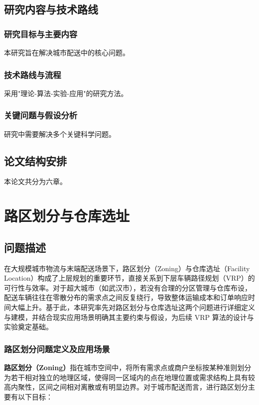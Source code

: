 \documentclass[12pt,a4paper,twoside]{ctexbook}
\begin{document}
\section{研究内容与技术路线}
\subsection{研究目标与主要内容}
本研究旨在解决城市配送中的核心问题。

\subsection{技术路线与流程}
采用"理论-算法-实验-应用"的研究方法。

\subsection{关键问题与假设分析}
研究中需要解决多个关键科学问题。

\section{论文结构安排}
本论文共分为六章。

\chapter{路区划分与仓库选址}
\section{问题描述}

在大规模城市物流与末端配送场景下，路区划分（Zoning）与仓库选址（Facility Location）构成了上层规划的重要环节，直接关系到下层车辆路径规划（VRP）的可行性与效率\cite{1}。对于超大城市（如武汉市），若没有合理的分区管理与仓库布设，配送车辆往往在零散分布的需求点之间反复绕行，导致整体运输成本和订单响应时间大幅上升。基于此，本研究率先对路区划分与仓库选址这两个问题进行详细定义与建模，并结合现实应用场景明确其主要约束与假设，为后续 VRP 算法的设计与实验奠定基础。

\subsection{路区划分问题定义及应用场景}

\textbf{路区划分（Zoning）}指在城市空间中，将所有需求点或商户坐标按某种准则划分为若干相对独立的地理区域，使得同一区域内的点在地理位置或需求结构上具有较高内聚性，区间之间相对离散或有明显边界\cite{2}。对于城市配送而言，进行路区划分主要有以下目标：
\end{document}
